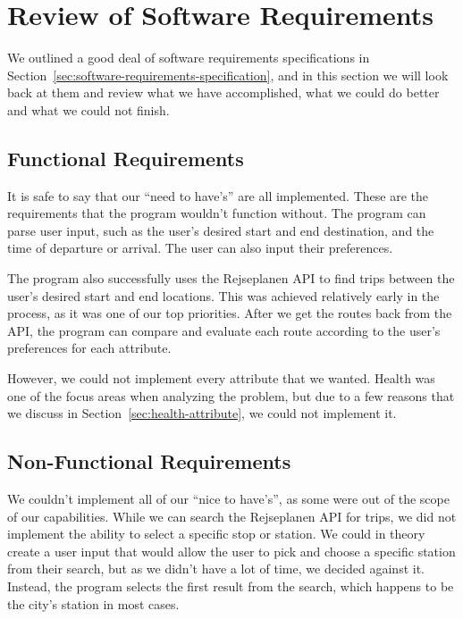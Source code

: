 \section{Review of Software Requirements}\label{sec:review-of-software-requirements}

We outlined a good deal of software requirements specifications in Section~\ref{sec:software-requirements-specification},
and in this section we will look back at them and review what we have accomplished, what we could do better and what we
could not finish.

\subsection{Functional Requirements}\label{subsec:functional-requirements}

It is safe to say that our ``need to have's'' are all implemented.
These are the requirements that the program wouldn't function without.
The program can parse user input, such as the user's desired start and end destination, and the time of departure or
arrival.
The user can also input their preferences.

The program also successfully uses the Rejseplanen API to find trips between the user's desired start and end locations.
This was achieved relatively early in the process, as it was one of our top priorities.
After we get the routes back from the API, the program can compare and evaluate each route according to the user's
preferences for each attribute.

However, we could not implement every attribute that we wanted.
Health was one of the focus areas when analyzing the problem, but due to a few reasons that we discuss in
Section~\ref{sec:health-attribute}, we could not implement it.

\subsection{Non-Functional Requirements}\label{subsec:non-functional-requirements}

We couldn't implement all of our ``nice to have's'', as some were out of the scope of our capabilities.
While we can search the Rejseplanen API for trips, we did not implement the ability to select a specific stop or station.
We could in theory create a user input that would allow the user to pick and choose a specific station from their search,
but as we didn't have a lot of time, we decided against it.
Instead, the program selects the first result from the search, which happens to be the city's station in most cases.

